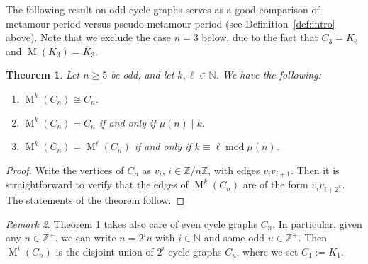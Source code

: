 \documentclass[12pt]{amsart}
\newtheorem{theorem}{Theorem}[section]
\theoremstyle{definition}
\newtheorem{definition}[theorem]{Definition}
\theoremstyle{remark}
\newtheorem{remark}[theorem]{Remark}
\numberwithin{equation}{section}
\numberwithin{figure}{section}
\renewcommand{\mod}{\operatorname{mod}}
\newcommand{\M}{\operatorname{M}}
\newcommand{\N}{\mathbb{N}}
\newcommand{\Z}{\mathbb{Z}}
\begin{document}

The following result on odd cycle graphs serves as a good comparison of metamour period versus pseudo-metamour period (see Definition~\ref{def:intro} above). Note that we exclude the case $n=3$ below, due to the fact that $C_3 = K_3$ and $\M(K_3)=\overline{K}_3$.
\begin{theorem} \label{thm: odd C_n}
    Let $n \geq 5$ be odd, and let $k,\ell\in\N$.
    We have the following:
    \begin{enumerate}
        \item $\M^k(C_n)\cong C_n$.
        \item $\M^k(C_n)=C_n$ if and only if $\mu(n) \mid k$.
        \item $\M^k(C_n)=\M^\ell(C_n)$ if and only if $k\equiv\ell\mod{\mu(n)}$.
    \end{enumerate}
\end{theorem}

\begin{proof}
    Write the vertices of $C_n$ as $v_i$, $i\in\Z/n\Z$, with edges $v_i v_{i+1}$. Then it is straightforward to verify that the edges of $\M^k(C_n)$ are of the form $v_i v_{i+2^k}$. The statements of the theorem follow.
\end{proof}

\begin{remark}
    Theorem \ref{thm: odd C_n} takes also care of even cycle graphs $C_n$. In particular, given any $n\in \Z^+$, we can write $n=2^i u$ with $i\in \N$ and some odd $u\in \Z^+$. Then $\M^i(C_n)$ is the disjoint union of $2^i$ cycle graphs $C_u$, where we set $C_1 := K_1$.
\end{remark}

\end{document}
